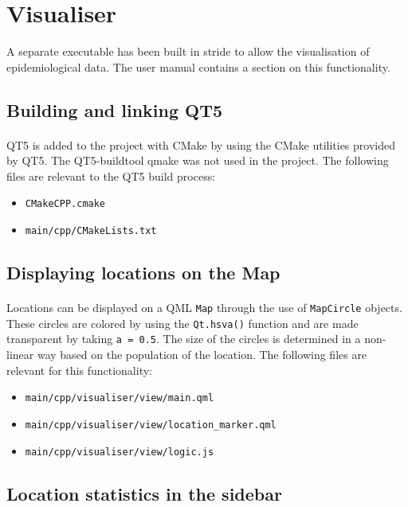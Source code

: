 \documentclass{article}
\begin{document}
\section{Visualiser}
A separate executable has been built in stride to allow the visualisation of epidemiological data. The user manual contains a section on this functionality.

\subsection{Building and linking QT5}

\paragraph{} QT5 is added to the project with CMake by using the CMake utilities provided by QT5. The QT5-buildtool qmake was not used in the project. The following files are relevant to the QT5 build process:
\begin{itemize}
\item \texttt{CMakeCPP.cmake}
\item \texttt{main/cpp/CMakeLists.txt}
\end{itemize}

\subsection{Displaying locations on the Map}

\paragraph{} Locations can be displayed on a QML \texttt{Map} through the use of \texttt{MapCircle} objects. These circles are colored by using the \texttt{Qt.hsva()} function and are made transparent by taking \texttt{a = 0.5}. The size of the circles is determined in a non-linear way based on the population of the location. The following files are relevant for this functionality:

\begin{itemize}
\item \texttt{main/cpp/visualiser/view/main.qml}
\item \texttt{main/cpp/visualiser/view/location\_marker.qml}
\item \texttt{main/cpp/visualiser/view/logic.js}
\end{itemize}

\subsection{Location statistics in the sidebar}
\end{document}
